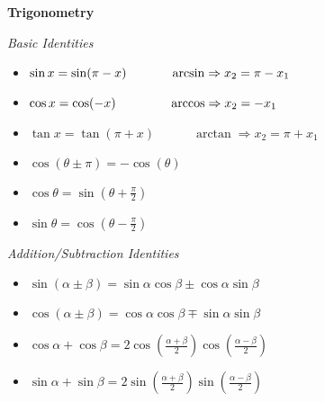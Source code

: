 \documentclass[twocolumn]{article}
\begin{document}
\dotfill

\textbf{Trigonometry}

\textit{Basic Identities} \vspace{-1em}
\begin{itemize}
    \item $\sin x = \sin(\pi - x) \hspace{3.5em} \arcsin \Rightarrow x_2 = \pi - x_1$
    \item $\cos x = \cos(-x) \hspace{4.25em} \arccos \Rightarrow x_2 = -x_1$
    \item $\tan x = \tan(\pi + x) \hspace{3em} \arctan \Rightarrow x_2 = \pi + x_1$
    \item $\cos(\theta \pm \pi) = -\cos(\theta)$
    \item $\cos \theta = \sin \left(\theta + \frac{\pi}{2} \right)$
    \item $\sin \theta = \cos \left(\theta - \frac{\pi}{2} \right)$
\end{itemize}

\textit{Addition/Subtraction Identities} \vspace{-1em}
\begin{itemize}
    \item $\sin(\alpha \pm \beta) = \sin \alpha \cos \beta \pm \cos \alpha \sin \beta$
    \item $\cos(\alpha \pm \beta) = \cos \alpha \cos \beta \mp \sin \alpha \sin \beta$
    \item $\cos \alpha + \cos \beta = 2 \cos \left( \frac{\alpha + \beta}{2} \right) \cos \left( \frac{\alpha - \beta}{2} \right)$
    \item $\sin \alpha + \sin \beta = 2 \sin \left( \frac{\alpha + \beta}{2} \right) \sin \left( \frac{\alpha - \beta}{2} \right)$
\end{itemize}
\end{document}
